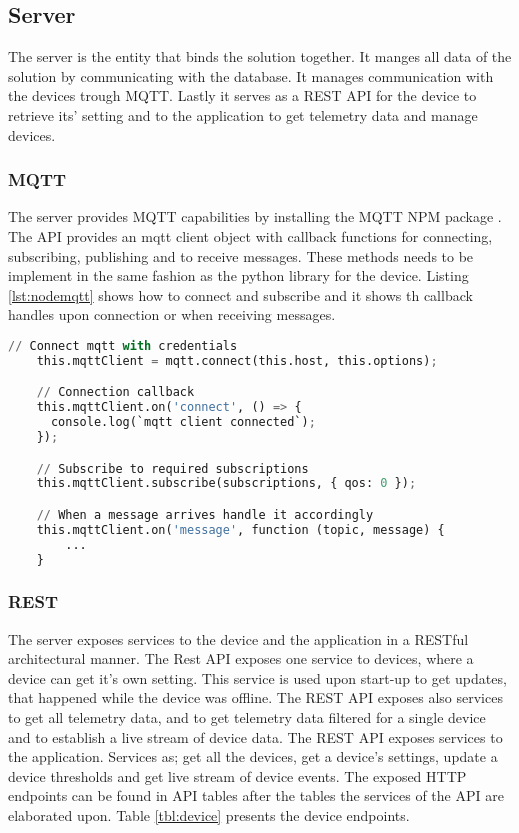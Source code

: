 \subsection{Server}
The server is the entity that binds the solution together. It manges all data of the solution by communicating with the database. It manages communication with the devices trough MQTT. Lastly it serves as a REST API for the device to retrieve its' setting and to the application to get telemetry data and manage devices. 

\subsubsection{MQTT}
The server provides MQTT capabilities by installing the MQTT NPM package \cite{mqtt}. The API provides an mqtt client object with callback functions for connecting, subscribing, publishing and to receive messages. These methods needs to be implement in the same fashion as the python library for the device. Listing \ref{lst:nodemqtt} shows how to connect and subscribe and it shows th callback handles upon connection or when receiving messages. 

\begin{lstlisting}[language=Python, caption=Node.js MQTT, label={lst:nodemqtt}, basicstyle=\tiny]
    // Connect mqtt with credentials
    this.mqttClient = mqtt.connect(this.host, this.options);

    // Connection callback
    this.mqttClient.on('connect', () => {
      console.log(`mqtt client connected`);
    });

    // Subscribe to required subscriptions
    this.mqttClient.subscribe(subscriptions, { qos: 0 });

    // When a message arrives handle it accordingly
    this.mqttClient.on('message', function (topic, message) {
        ...
    }
\end{lstlisting}

\subsubsection{REST}
The server exposes services to the device and the application in a RESTful architectural manner. The Rest API exposes one service to devices, where a device can get it's own setting. This service is used upon start-up to get updates, that happened while the device was offline. 
The REST API exposes also services to get all telemetry data, and to get telemetry data filtered for a single device and to establish a live stream of device data. 
The REST API exposes services to the application. Services as; get all the devices, get a device's settings, update a device thresholds and get live stream of device events. The exposed HTTP endpoints can be found in API tables after the tables the services of the API are elaborated upon. Table \ref{tbl:device} presents the device endpoints. 

